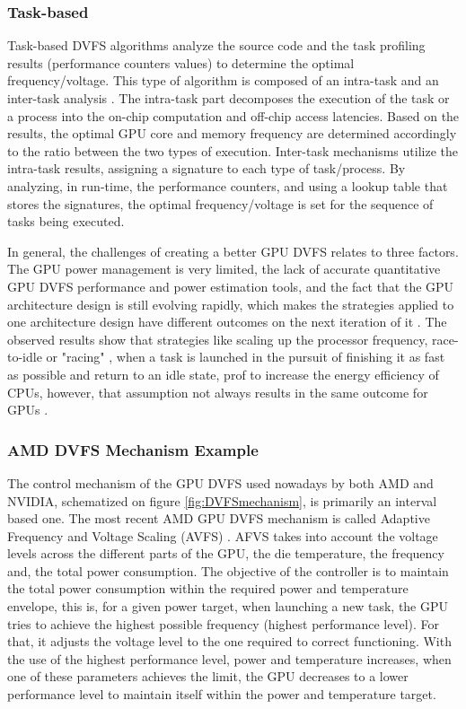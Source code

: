 \subsubsection{Task-based}

Task-based DVFS algorithms analyze the source code and the task profiling results (performance counters values) to determine the optimal frequency/voltage. This type of algorithm is composed of an intra-task and an inter-task analysis \cite{noauthor_time_nodate}. The intra-task part decomposes the execution of the task or a process into the on-chip computation and off-chip access latencies. Based on the results,  the optimal GPU core and memory frequency are determined accordingly to the ratio between the two types of execution. Inter-task mechanisms utilize the intra-task results, assigning a signature to each type of task/process. By analyzing, in run-time, the performance counters, and using a lookup table that stores the signatures, the optimal frequency/voltage is set for the sequence of tasks being executed.

In general, the challenges of creating a better GPU DVFS relates to three factors. The GPU power management is very limited, the lack of accurate quantitative GPU DVFS performance and power estimation tools, and the fact that the GPU architecture design is still evolving rapidly, which makes the strategies applied to one architecture design have different outcomes on the next iteration of it \cite{mei_survey_2016}. The observed results show that strategies like scaling up the processor frequency, race-to-idle  \cite{hoffmann_racing_2013} or "racing" \cite{kim_racing_2015}, when a task is launched in the pursuit of finishing it as fast as possible and return to an idle state, prof to increase the energy efficiency of CPUs, however, that assumption not always results in the same outcome for GPUs \cite{kim_racing_2015}. 

\subsubsection{AMD DVFS Mechanism Example}

The control mechanism of the GPU DVFS used nowadays by both AMD and NVIDIA, schematized on figure \ref{fig:DVFSmechanism}, is primarily an interval based one. The most recent AMD GPU DVFS mechanism is called Adaptive Frequency and Voltage Scaling (AVFS) \cite{amd_polaris_nodate}. AFVS takes into account the voltage levels across the different parts of the GPU, the die temperature, the frequency and, the total power consumption. The objective of the controller is to maintain the total power consumption within the required power and temperature envelope, this is, for a given power target, when launching a new task, the GPU tries to achieve the highest possible frequency (highest performance level). For that, it adjusts the voltage level to the one required to correct functioning. With the use of the highest performance level, power and temperature increases, when one of these parameters achieves the limit, the GPU decreases to a lower performance level to maintain itself within the power and temperature target. 

